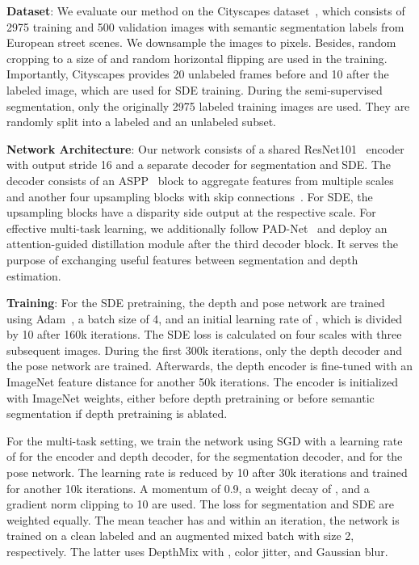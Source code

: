 \documentclass[final]{cvpr}
\begin{document}
\noindent\textbf{Dataset}: 
We evaluate our method on the Cityscapes dataset~\cite{cordts2016cityscapes}, which consists of 2975 training and 500 validation images with semantic segmentation labels from European street scenes. We downsample the images to  pixels. Besides, random cropping to a size of  and random horizontal flipping are used in the training. Importantly, Cityscapes provides 20 unlabeled frames before and 10 after the labeled image, which are used for SDE training. During the semi-supervised segmentation, only the originally 2975 labeled training images are used. They are randomly split into a labeled and an unlabeled subset. 

\noindent\textbf{Network Architecture}: 
Our network consists of a shared ResNet101~\cite{he2016deep} encoder with output stride 16 and a separate decoder for segmentation and SDE. The decoder consists of an ASPP~\cite{chen2017deeplab} block to aggregate features from multiple scales and another four upsampling blocks with skip connections~\cite{ronneberger2015u}. For SDE, the upsampling blocks have a disparity side output at the respective scale. For effective multi-task learning, we additionally follow PAD-Net~\cite{xu2018pad} and deploy an attention-guided distillation module after the third decoder block. It serves the purpose of exchanging useful features between segmentation and depth estimation. 

\noindent\textbf{Training}:
For the SDE pretraining, the depth and pose network are trained using Adam~\cite{kingma2014adam}, a batch size of 4, and an initial learning rate of , which is divided by 10 after 160k iterations. The SDE loss is calculated on four scales with three subsequent images. During the first 300k iterations, only the depth decoder and the pose network are trained. Afterwards, the depth encoder is fine-tuned with an ImageNet feature distance  for another 50k iterations. The encoder is initialized with ImageNet weights, either before depth pretraining or before semantic segmentation if depth pretraining is ablated.

For the multi-task setting, we train the network using SGD with a learning rate of  for the encoder and depth decoder,  for the segmentation decoder, and  for the pose network. The learning rate is reduced by 10 after 30k iterations and trained for another 10k iterations. A momentum of 0.9, a weight decay of , and a gradient norm clipping to 10 are used. The loss for segmentation and SDE are weighted equally. The mean teacher has  and within an iteration, the network is trained on a clean labeled and an augmented mixed batch with size 2, respectively. The latter uses DepthMix with , color jitter, and Gaussian blur.
\end{document}
